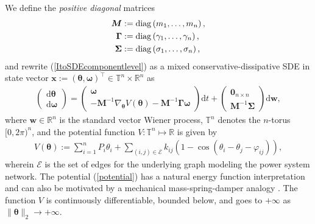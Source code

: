 \documentclass[10pt,twocolumn]{IEEEtran}
\begin{document}
We define the \emph{positive diagonal} matrices
\begin{align*}
\bm{M} &:= {\rm{diag}}\left(m_{1},\hdots,m_{n}\right), \nonumber\\
\bm{\Gamma} &:= {\rm{diag}}\left(\gamma_{1},\hdots,\gamma_{n}\right),\nonumber\\
\bm{\Sigma} &:= {\rm{diag}}\left(\sigma_{1},\hdots,\sigma_{n}\right),
\end{align*}
and rewrite (\ref{ItoSDEcomponentlevel}) as a mixed conservative-dissipative SDE in state vector $\bm{x} := (\bm{\theta},\bm{\omega})^{\top} \in \mathbb{T}^{n} \times \mathbb{R}^{n}$ as
\begin{align}
\begin{pmatrix}
{\mathrm{d}}\bm{\theta}\\
{\mathrm{d}}\bm{\omega}	
\end{pmatrix}
\! = \!\begin{pmatrix}
\bm{\omega}\\
-\bm{M}^{-1}\nabla_{\bm{\theta}}V(\bm{\theta}) -\bm{M}^{-1}\bm{\Gamma}\bm{\omega}  	
\end{pmatrix}{\mathrm{d}}t + \!\begin{pmatrix}
 \bm{0}_{n\times n}\\
 \bm{M}^{-1}\bm{\Sigma}	
 \end{pmatrix}{\mathrm{d}}\bm{w},
\label{ItoSDEvectorlevel}
\end{align}
where 
$\bm{w}\in\mathbb{R}^{n}$ is the standard vector Wiener process, $\mathbb{T}^{n}$ denotes the $n$-torus $[0,2\pi)^{n}$, and the potential function $V : \mathbb{T}^{n} \mapsto \mathbb{R}$ is given by
\begin{align}
V(\bm{\theta}) := \displaystyle\sum_{i=1}^{n} P_{i}\theta_{i} + \!\displaystyle\sum_{(i,j)\in\mathcal{E}}\!k_{ij}\left(1 - \cos(\theta_{i}-\theta_{j}-\varphi_{ij})\right),
\label{potential}	
\end{align}
wherein $\mathcal{E}$ is the set of edges for the underlying graph modeling the power system network. The potential (\ref{potential}) has a natural energy function interpretation and can also be motivated by a mechanical mass-spring-damper analogy \cite{dorfler2013synchronization,ishizaki2018}. The function $V$ is continuously differentiable, bounded below, and goes to $+\infty$ as $\|\bm{\theta}\|_{2}\rightarrow +\infty$.
\end{document}
